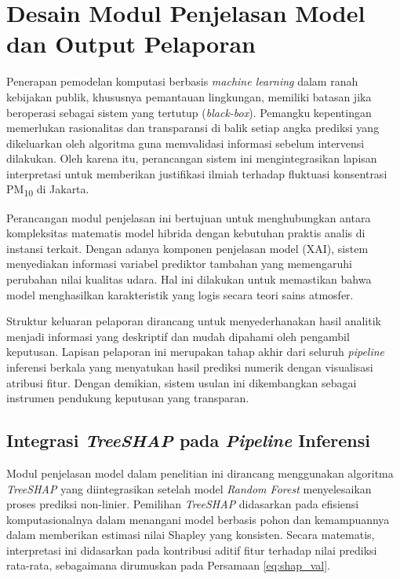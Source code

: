 \section{Desain Modul Penjelasan Model dan Output Pelaporan}

Penerapan pemodelan komputasi berbasis \textit{machine learning} dalam ranah kebijakan publik, khususnya pemantauan lingkungan, memiliki batasan jika beroperasi sebagai sistem yang tertutup (\textit{black-box}). Pemangku kepentingan memerlukan rasionalitas dan transparansi di balik setiap angka prediksi yang dikeluarkan oleh algoritma guna memvalidasi informasi sebelum intervensi dilakukan. Oleh karena itu, perancangan sistem ini mengintegrasikan lapisan interpretasi untuk memberikan justifikasi ilmiah terhadap fluktuasi konsentrasi PM\textsubscript{10} di Jakarta.

Perancangan modul penjelasan ini bertujuan untuk menghubungkan antara kompleksitas matematis model hibrida dengan kebutuhan praktis analis di instansi terkait. Dengan adanya komponen penjelasan model (XAI), sistem menyediakan informasi variabel prediktor tambahan yang memengaruhi perubahan nilai kualitas udara. Hal ini dilakukan untuk memastikan bahwa model menghasilkan karakteristik yang logis secara teori sains atmosfer.

Struktur keluaran pelaporan dirancang untuk menyederhanakan hasil analitik menjadi informasi yang deskriptif dan mudah dipahami oleh pengambil keputusan. Lapisan pelaporan ini merupakan tahap akhir dari seluruh \textit{pipeline} inferensi berkala yang menyatukan hasil prediksi numerik dengan visualisasi atribusi fitur. Dengan demikian, sistem usulan ini dikembangkan sebagai instrumen pendukung keputusan yang transparan.

\subsection{Integrasi \textit{TreeSHAP} pada \textit{Pipeline} Inferensi}

Modul penjelasan model dalam penelitian ini dirancang menggunakan algoritma \textit{TreeSHAP} yang diintegrasikan setelah model \textit{Random Forest} menyelesaikan proses prediksi non-linier. Pemilihan \textit{TreeSHAP} didasarkan pada efisiensi komputasionalnya dalam menangani model berbasis pohon dan kemampuannya dalam memberikan estimasi nilai Shapley yang konsisten. Secara matematis, interpretasi ini didasarkan pada kontribusi aditif fitur terhadap nilai prediksi rata-rata, sebagaimana dirumuskan pada Persamaan \ref{eq:shap_val}.

